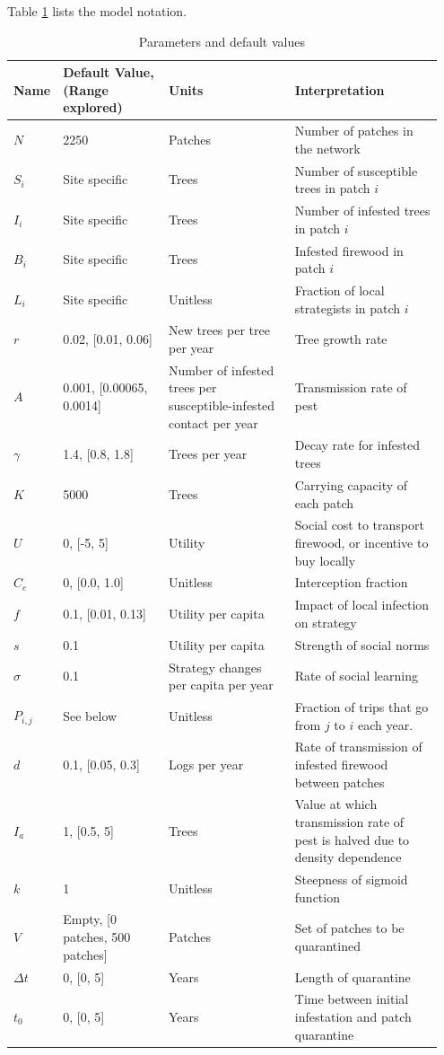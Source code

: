 Table \ref{t1} lists the model notation.



\begin{table}
\footnotesize
\begin{tabular}{ p{0.05\linewidth} | p{0.25\linewidth} | p{0.3\linewidth}  | p{0.35\linewidth}}
  Name &  Default Value, (Range explored) & Units  & Interpretation \\
  \hline
  $N$ & 2250  & 
Patches &Number of patches in the network \\
  $S_i$ & Site specific & Trees  & Number of susceptible trees in patch $i$\\
  $I_i$ & Site specific & 
Trees &Number of infested trees in patch $i$\\
  $B_i$ & Site specific & 
Trees & Infested firewood in patch $i$\\
  $L_i$ & Site specific & 
Unitless &Fraction of local strategists in patch $i$\\
  $r$ & 0.02, [0.01, 0.06]  & 
New trees per tree per year &  Tree growth rate\\
  $A$ & 0.001, [0.00065, 0.0014] & 
Number of infested trees per susceptible-infested contact per year &  Transmission rate of pest\\
  $\gamma$& 1.4, [0.8, 1.8] & 
Trees per year & Decay rate for infested trees\\
  $K$ & 5000 & 
Trees & Carrying capacity of each patch\\
  $U$ & 0, [-5, 5] & 
Utility &  Social cost to transport firewood, or incentive to buy locally\\
  $C_e$ & 0, [0.0, 1.0]  & 
Unitless &Interception fraction \\
  $f$ & 0.1, [0.01, 0.13] & 
Utility per capita & Impact of local infection on strategy\\
  $s$ & 0.1 & 
Utility per capita & Strength of social norms\\
  $\sigma$ & 0.1 & 
Strategy changes per capita per year  & Rate of social learning\\
  $P_{i,j}$ & See below & 
Unitless &  Fraction of trips that go from $j$ to $i$ each year.\\
  $d$ & 0.1, [0.05, 0.3] & 
Logs per year & Rate of transmission of infested firewood between patches\\
  $I_a$ & 1, [0.5, 5] & 
Trees & Value at which transmission rate of pest is halved due to density dependence \\
  $k$ & 1 & 
Unitless & Steepness of sigmoid function\\
  $V$ & Empty, [0 patches, 500 patches] & 
Patches & Set of patches to be quarantined \\
  $\Delta t$ & 0, [0, 5] & 
Years & Length of quarantine \\
  $t_0 $ & 0, [0, 5] & 
Years  & Time between initial infestation and patch quarantine\\
\end{tabular}
\caption{Parameters and default values}
\label{t1}
\end{table}
\normalsize
